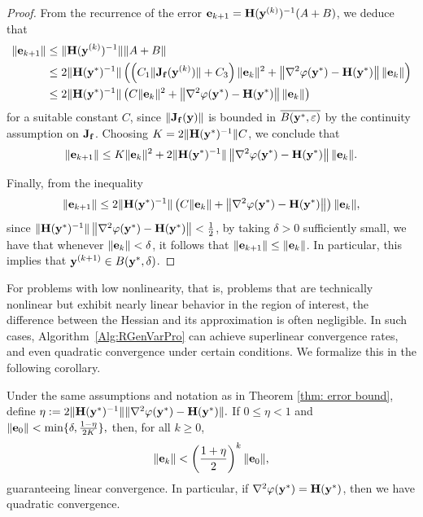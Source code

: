 \documentclass[onefignum,onetabnum]{siamart171218}
\newcommand{\bH}{{\bf H}}
\newcommand{\bJ}{{\bf J}}
\newcommand{\be}{{\bf e}}
\newcommand{\bff}{{\bf f}}
\newcommand{\by}{{\bf y}}
\begin{document}
\begin{proof}
From the recurrence of the error $\be_{k+1} = \bH(\by^{(k)})^{-1} (A+B)$, we deduce that
\begin{align*}
\|\be_{k+1}\| & \leq \|\bH(\by^{(k)})^{-1}\| \| A + B\| \\
& \leq 2 \|\bH(\by^*)^{-1}\|
\left( \left( C_1 \|\bJ_{\bf f}(\by^{(k)})\| + C_3 \right) \|\be_k\|^2
+ \left\| \nabla^2 \varphi(\by^*) - \bH(\by^*) \right\| \|\be_k\| \right) \\
& \leq 2 \|\bH(\by^*)^{-1}\|
\left( C \|\be_k\|^2
+ \left\| \nabla^2 \varphi(\by^*) - \bH(\by^*) \right\| \|\be_k\| \right) 
\end{align*}
for a suitable constant $C$, since $ \|\bJ_{\bf f}(\by)\|$ is bounded in $\overline{B(\by^*, \varepsilon)}$ by the continuity assumption on $\bJ_\bff$.
Choosing $K = 2 \|\bH(\by^*)^{-1}\| C$, we conclude that
\begin{equation*}
\|\be_{k+1}\| \leq  K \|\be_k\|^2 +  2 \|\bH(\by^*)^{-1}\|\left\| \nabla^2 \varphi(\by^*) - \bH(\by^*) \right\|  \|\be_k\| .
\end{equation*}

Finally, from the inequality 
\[ \|\be_{k+1}\|\leq 2 \|\bH(\by^*)^{-1}\|
\left( C \|\be_k\|
+ \left\| \nabla^2 \varphi(\by^*) - \bH(\by^*) \right\| \right) \|\be_k\|, \]
since  $\|\bH(\by^*)^{-1}\| \left\| \nabla^2 \varphi(\by^*) - \bH(\by^*) \right\| < \frac{1}{2} $,
by taking $\delta >0$ sufficiently small, we have that whenever $\|\be_k\|<\delta$, it follows that $\|\be_{k+1}\|\le \|\be_k\|$. In particular, this implies that $\by^{(k+1)}\in B(\by^*, \delta)$.
\end{proof}

For problems with low nonlinearity, that is, problems that are technically nonlinear but exhibit nearly linear behavior in the region of interest, the difference between the Hessian and its approximation is often negligible. In such cases, Algorithm~\ref{Alg:RGenVarPro} can achieve superlinear convergence rates, and even quadratic convergence under certain conditions. We formalize this in the following corollary.

\begin{corollary}
Under the same assumptions and notation as in Theorem \ref{thm: error bound}, define
$
\eta := 2 \|\bH(\by^*)^{-1}\|\|\nabla^2 \varphi(\by^*) - \bH(\by^*)\|.
$
If $0 \leq \eta < 1$ and $\|\be_0\| < \min\{ \delta, \frac{1 - \eta}{2K}\},$
then, for all $k\ge 0$,
\[
\|\be_k\| < \left( \frac{1 + \eta}{2} \right)^k \|\be_0\|,
\]
guaranteeing linear convergence. In particular, if $\nabla^2 \varphi(\by^*) = \bH(\by^*)$, then we have quadratic convergence.
\end{corollary}
\end{document}
